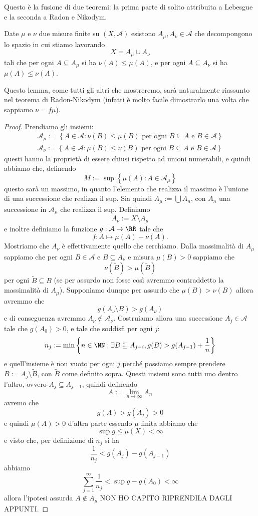 \documentclass[11pt]{scrartcl}
\begin{document}
	Questo è la fusione di due teoremi: la prima parte di solito attribuita a Lebesgue e la seconda a Radon e Nikodym.
	\begin{lemma}
		Date $\mu$ e $\nu$ due misure finite su $(X,\mathcal{A})$ esistono $A_\mu, A_\nu\in\mathcal{A}$ che decompongono lo spazio in cui stiamo lavorando
		$$X=A_\mu \cup A_\nu$$
		tali che per ogni $A\subseteq A_\mu$ si ha $\nu(A)\le \mu(A)$, e per ogni $A\subseteq A_\nu$ si ha $\mu(A)\le \nu(A)$.
	\end{lemma}
	\begin{remark}
		Questo lemma, come tutti gli altri che mostreremo, sarà naturalmente riassunto nel teorema di Radon-Nikodym (infatti è molto facile dimostrarlo una volta che sappiamo $\nu = f\mu$).
	\end{remark}
	\begin{proof}
		Prendiamo gli insiemi:
		\begin{gather*}
			\mathcal{A}_\mu:=\left\{A\in \mathcal{A}:\nu(B)\le \mu(B)\text{ per ogni $B\subseteq A$ e $B\in \mathcal{A}$}\right\} \\
			\mathcal{A}_\nu:=\left\{A\in \mathcal{A}:\mu(B)\le \nu(B)\text{ per ogni $B\subseteq A$ e $B\in \mathcal{A}$}\right\}
		\end{gather*}
		questi hanno la proprietà di essere chiusi rispetto ad unioni numerabili, e quindi abbiamo che, definendo
		$$M:=\sup\left\{\mu(A):A\in \mathcal{A}_\mu\right\}$$
		questo sarà un massimo, in quanto l'elemento che realizza il massimo è l'unione di una successione che realizza il sup. Sia quindi $A_\mu := \bigcup A_n$, con $A_n$ una successione in $\mathcal{A}_\mu$ che realizza il sup. Definiamo 
		$$A_\nu:=X\setminus A_\mu$$
		e inoltre definiamo la funzione $g:\mathcal{A}\to \RR$ tale che 
		$$f:A\mapsto \mu(A)-\nu(A).$$
		Mostriamo che $A_\nu$ è effettivamente quello che cerchiamo. Dalla massimalità di $A_\mu$ sappiamo che per ogni $B\in\mathcal{A}$ e $B\subseteq A_\nu$ e misura $\mu(B)>0$ sappiamo che
		$$\nu(\tilde{B})>\mu(\tilde{B})$$
		per ogni $\tilde{B}\subseteq B$ (se per assurdo non fosse così avremmo contraddetto la massimalità di $A_\mu$). Supponiamo dunque per assurdo che $\mu(B)>\nu(B)$ allora avremmo che 
		$$g\left(A_\nu\setminus B\right)>g(A_\nu)$$
		e di conseguenza avremmo $A_\nu\not\in \mathcal{A}_\nu$. Costruiamo allora una successione $A_j\in \mathcal{A}$ tale che $g(A_0)>0$, e tale che soddisfi per ogni $j$:
		$$n_j:=\min\left\{n\in\NN:\exists B \subseteq A_{j-i},g(B)>g(A_{j-1})+\frac{1}{n}\right\}$$
		e quell'insieme è non vuoto per ogni $j$ perché possiamo sempre prendere $B:=A_j\setminus \tilde{B}$, con $\tilde{B}$ come definito sopra. Questi insiemi sono tutti uno dentro l'altro, ovvero $A_j\subseteq A_{j-1}$, quindi definendo
		$$A:=\lim_{n\to\infty}A_n$$
		avremo che
		$$g(A)>g(A_j)>0$$
		e quindi $\mu(A)>0$ d'altra parte essendo $\mu$ finita abbiamo che
		$$\sup g \le \mu(X)<\infty$$
		e visto che, per definizione di $n_j$ si ha
		$$\frac{1}{n_j}<g(A_j)-g(A_{j-1})$$
		abbiamo
		$$\sum_{j=1}^\infty \frac{1}{n_j}<\sup g - g(A_0)<\infty$$
		allora l'ipotesi assurda $A\not\in A_\mu$ NON HO CAPITO RIPRENDILA DAGLI APPUNTI.
	\end{proof}
\end{document}

